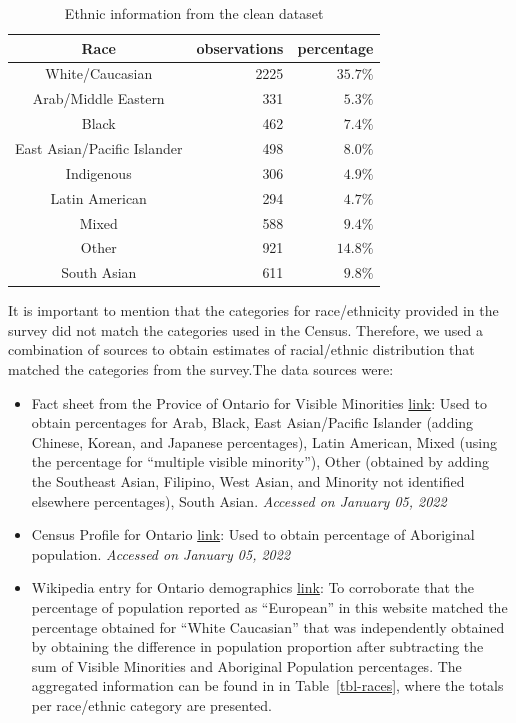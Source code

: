 \documentclass[
  letterpaper,
  DIV=11,
  numbers=noendperiod]{scrartcl}
\begin{document}
\begin{longtable}{crr}
\caption{Ethnic information from the clean dataset}\tabularnewline

\toprule
Race & observations & percentage \\ 
\midrule
White/Caucasian & 2225 & $35.7\%$ \\ 
Arab/Middle Eastern & 331 & $5.3\%$ \\ 
Black & 462 & $7.4\%$ \\ 
East Asian/Pacific Islander & 498 & $8.0\%$ \\ 
Indigenous & 306 & $4.9\%$ \\ 
Latin American & 294 & $4.7\%$ \\ 
Mixed & 588 & $9.4\%$ \\ 
Other & 921 & $14.8\%$ \\ 
South Asian & 611 & $9.8\%$ \\ 
\bottomrule
\end{longtable}

It is important to mention that the categories for race/ethnicity
provided in the survey did not match the categories used in the Census.
Therefore, we used a combination of sources to obtain estimates of
racial/ethnic distribution that matched the categories from the
survey.The data sources were:

\begin{itemize}
\item
  Fact sheet from the Provice of Ontario for Visible Minorities
  \href{https://www.ontario.ca/document/2016-census-highlights/fact-sheet-9-ethnic-origin-and-visible-minorities}{link}:
  Used to obtain percentages for Arab, Black, East Asian/Pacific
  Islander (adding Chinese, Korean, and Japanese percentages), Latin
  American, Mixed (using the percentage for ``multiple visible
  minority''), Other (obtained by adding the Southeast Asian, Filipino,
  West Asian, and Minority not identified elsewhere percentages), South
  Asian. \emph{Accessed on January 05, 2022}
\item
  Census Profile for Ontario
  \href{https://www12.statcan.gc.ca/census-recensement/2016/dp-pd/prof/details/page.cfm?Lang=E\&Geo1=PR\&Code1=35\&Geo2=PR\&Code2=01\&SearchText=Ontario\&SearchType=Begins\&SearchPR=01\&B1=Aboriginal\%20peoples\&TABID=1\&type=1}{link}:
  Used to obtain percentage of Aboriginal population. \emph{Accessed on
  January 05, 2022}
\item
  Wikipedia entry for Ontario demographics
  \href{https://en.wikipedia.org/wiki/Demographics_of_Ontario}{link}: To
  corroborate that the percentage of population reported as ``European''
  in this website matched the percentage obtained for ``White
  Caucasian'' that was independently obtained by obtaining the
  difference in population proportion after subtracting the sum of
  Visible Minorities and Aboriginal Population percentages. The
  aggregated information can be found in in Table~\ref{tbl-races}, where
  the totals per race/ethnic category are presented.
\end{itemize}
\end{document}
